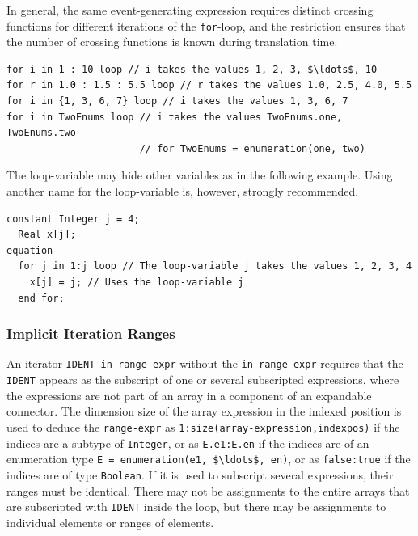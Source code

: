 \begin{nonnormative}
In general, the same event-generating expression requires distinct crossing functions for different iterations of the \lstinline!for!-loop, and the restriction ensures that the number of crossing functions is known during translation time.
\end{nonnormative}

\begin{example}
\begin{lstlisting}[language=modelica]
for i in 1 : 10 loop // i takes the values 1, 2, 3, $\ldots$, 10
for r in 1.0 : 1.5 : 5.5 loop // r takes the values 1.0, 2.5, 4.0, 5.5
for i in {1, 3, 6, 7} loop // i takes the values 1, 3, 6, 7
for i in TwoEnums loop // i takes the values TwoEnums.one, TwoEnums.two
                       // for TwoEnums = enumeration(one, two)
\end{lstlisting}
The loop-variable may hide other variables as in the following example.
Using another name for the loop-variable is, however, strongly recommended.
\begin{lstlisting}[language=modelica]
  constant Integer j = 4;
  Real x[j];
equation
  for j in 1:j loop // The loop-variable j takes the values 1, 2, 3, 4
    x[j] = j; // Uses the loop-variable j
  end for;
\end{lstlisting}
\end{example}


\subsubsection{Implicit Iteration Ranges}\label{implicit-iteration-ranges}

An iterator \lstinline!IDENT in range-expr! without the \lstinline!in range-expr! requires that the \lstinline!IDENT! appears as the subscript of one or several subscripted expressions, where the expressions are not part of an array in a component of an expandable connector.
The dimension size of the array expression in the indexed position is used to deduce the \lstinline!range-expr! as \lstinline!1:size(array-expression,indexpos)! if the indices are a subtype of \lstinline!Integer!, or as \lstinline!E.e1:E.en! if the indices are of an enumeration type \lstinline!E = enumeration(e1, $\ldots$, en)!, or as \lstinline!false:true! if the indices are of type \lstinline!Boolean!.
If it is used to subscript several expressions, their ranges must be identical.
There may not be assignments to the entire arrays that are subscripted with \lstinline!IDENT! inside the loop, but there may be assignments to individual elements or ranges of elements.

